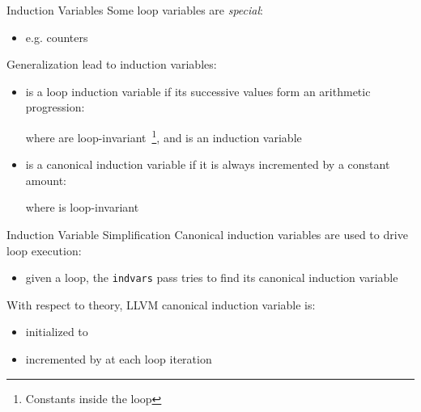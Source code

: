 \begin{frame}{Induction Variables}
Some loop variables are \emph{special}:

\begin{itemize}
\item e.g. counters
\end{itemize}

\vfill
Generalization lead to \alert{induction variables}:

\begin{itemize}
\item {} is a loop induction variable if its successive values form
      an arithmetic progression:

      \begin{center}
      \end{center}

      where  are
      loop-invariant~\footnote{Constants inside the loop}, and  is
      an induction variable
\item {} is a \alert{canonical} induction variable if it is always
      incremented by a constant amount:

      \begin{center}
      \end{center}

      where  is loop-invariant
\end{itemize}
\end{frame}

\begin{frame}{Induction Variable Simplification}
Canonical induction variables are used to \alert{drive} loop execution:

\begin{itemize}
\item given a loop, the \texttt{indvars} pass tries to find its canonical
      induction variable
\end{itemize}

\vfill
With respect to theory, LLVM canonical induction variable is:

\begin{itemize}
\item initialized to 
\item incremented by  at each loop iteration
\end{itemize}
\end{frame}

